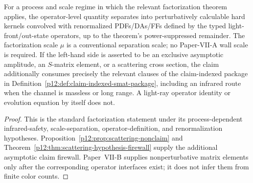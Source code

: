 \documentclass[12pt,a4paper]{article}
\begin{document}
\begin{theorem}
\label{p11:thm:native-qcd-factorization-bridge}

For a process and scale regime in which the relevant factorization theorem
applies, the operator-level quantity separates into perturbatively calculable
hard kernels convolved with renormalized PDFs/DAs/FFs defined by the typed
light-front/out-state operators, up to the theorem's power-suppressed remainder.
The factorization scale \(\mu\) is a conventional separation scale; no Paper-VII-A
wall scale is required.  If the left-hand side is asserted to be an exclusive
asymptotic amplitude, an \(S\)-matrix element, or a scattering cross section,
the claim additionally consumes precisely the relevant clauses of the
claim-indexed package in Definition~\ref{p12:def:claim-indexed-smat-package},
including an infrared route when the channel is massless or long range.  A
light-ray operator identity or evolution equation by itself does not.
\label{p11:eq:gauge-invariant-pdf-definition}
\label{p11:eq:hard-factorization-bridge}
\end{theorem}
\begin{proof}

This is the standard factorization statement under its process-dependent
infrared-safety, scale-separation, operator-definition, and renormalization
hypotheses.  Proposition~\ref{p12:prop:scattering-nonclaim} and
Theorem~\ref{p12:thm:scattering-hypothesis-firewall} supply the additional
asymptotic claim firewall.  Paper~VII-B supplies nonperturbative matrix elements
only after the corresponding operator interfaces exist; it does not infer them
from finite color counts.
\end{proof}
\end{document}
